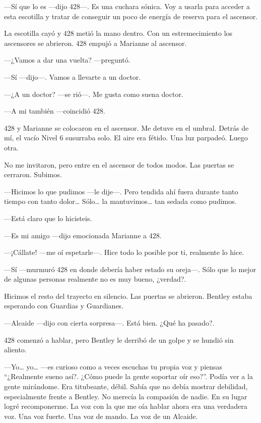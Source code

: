 ---Sí que lo es ---dijo 428---. Es una cuchara sónica. Voy a usarla para
acceder a esta escotilla y tratar de conseguir un poco de energía de
reserva para el ascensor.

La escotilla cayó y 428 metió la mano dentro. Con un estremecimiento los
ascensores se abrieron. 428 empujó a Marianne al ascensor.

---¿Vamos a dar una vuelta? ---preguntó.

---Sí ---dijo---. Vamos a llevarte a un doctor.

---¿A un doctor? ---se rió---. Me gusta como suena doctor.

---A mi también ---coincidió 428.

428 y Marianne se colocaron en el ascensor. Me detuve en el umbral.
Detrás de mí, el vacío Nivel 6 susurraba solo. El aire era fétido. Una
luz parpadeó. Luego otra.

No me invitaron, pero entre en el ascensor de todos modos. Las puertas
se cerraron. Subimos.

---Hicimos lo que pudimos ---le dije---. Pero tendida ahí fuera durante
tanto tiempo con tanto dolor\ldots{} Sólo\ldots{} la mantuvimos\ldots{}
tan sedada como pudimos.

---Está claro que lo hicisteis.

---Es mi amigo ---dijo emocionada Marianne a 428.

---¡Cállate! ---me oí espetarle---. Hice todo lo posible por ti,
realmente lo hice.

---Sí ---murmuró 428 en donde debería haber estado su oreja---. Sólo que
lo mejor de algunas personas realmente no es muy bueno, ¿verdad?.

Hicimos el resto del trayecto en silencio. Las puertas se abrieron.
Bentley estaba esperando con Guardias y Guardianes.

---Alcaide ---dijo con cierta sorpresa---. Está bien. ¿Qué ha pasado?.

428 comenzó a hablar, pero Bentley le derribó de un golpe y se hundió
sin aliento.

---Yo\ldots{} yo\ldots{} ---es curioso como a veces escuchas tu propia
voz y piensas ``¿Realmente sueno así?. ¿Cómo puede la gente soportar oír
eso?''. Podía ver a la gente mirándome. Era titubeante, débil. Sabía que
no debía mostrar debilidad, especialmente frente a Bentley. No merecía
la compasión de nadie. En su lugar logré recomponerme. La voz con la que
me oía hablar ahora era una verdadera voz. Una voz fuerte. Una voz de
mando. La voz de un Alcaide.

